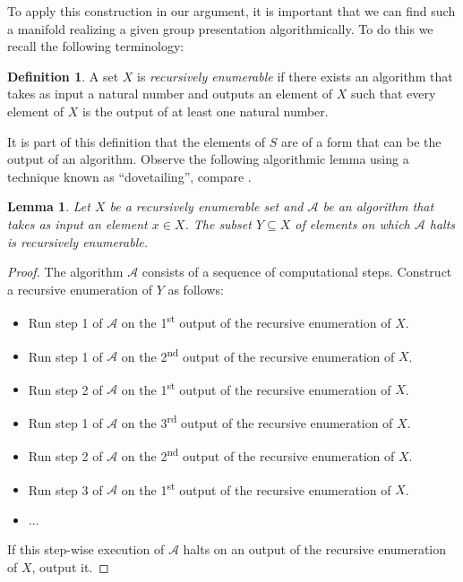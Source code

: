 \documentclass[a4paper, reqno]{amsart}
\newtheorem{lemma}[proposition]{Lemma}
\theoremstyle{definition}
\newtheorem{definition}[proposition]{Definition}
\theoremstyle{remark}
\renewcommand{\~}{\nobreak\ }
\begin{document}
To apply this construction in our argument, it is important that we can find such a manifold realizing a given group presentation algorithmically. To do this we recall the following terminology:
\begin{definition}
    A set $X$ is \emph{recursively enumerable} if there exists an algorithm that takes as input a natural number and outputs an element of $X$ such that every element of $X$ is the output of at least one natural number.
\end{definition}
It is part of this definition that the elements of $S$ are of a form that can be the output of an algorithm. Observe the following algorithmic lemma using a technique known as \enquote{dovetailing}, compare \cite[Corollary 7.15]{boolos_burgess_jeffrey}.
\begin{lemma}\label{lem:recenum}
    Let $X$ be a recursively enumerable set and $\mathcal A$ be an algorithm that takes as input an element $x\in X$. The subset $Y\subseteq X$ of elements on which $\mathcal A$ halts is recursively enumerable. 
\end{lemma}
\begin{proof}
    The algorithm $\mathcal A$ consists of a sequence of computational steps. Construct a recursive enumeration of $Y$ as follows:
    \begin{itemize}
        \item Run step 1 of $\mathcal A$ on the 1\textsuperscript{st} output of the recursive enumeration of $X$.
        \item Run step 1 of $\mathcal A$ on the 2\textsuperscript{nd} output of the recursive enumeration of $X$.
        \item Run step 2 of $\mathcal A$ on the 1\textsuperscript{st} output of the recursive enumeration of $X$.
        \item Run step 1 of $\mathcal A$ on the 3\textsuperscript{rd} output of the recursive enumeration of $X$.
        \item Run step 2 of $\mathcal A$ on the 2\textsuperscript{nd} output of the recursive enumeration of $X$.
        \item Run step 3 of $\mathcal A$ on the 1\textsuperscript{st} output of the recursive enumeration of $X$.
        \item $\dots$
    \end{itemize}
    If this step-wise execution of $\mathcal A$ halts on an output of the recursive enumeration of $X$, output it. 
\end{proof}
\end{document}
